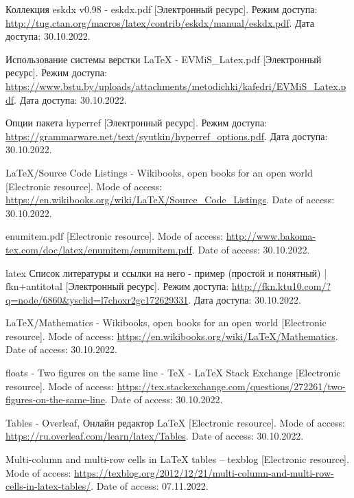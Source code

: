   \begin{thebibliography}{}
    Коллекция eskdx v0.98 - eskdx.pdf
    [Электронный ресурс].
    Режим доступа: \url{http://tug.ctan.org/macros/latex/contrib/eskdx/manual/eskdx.pdf}.
    Дата доступа: 30.10.2022.
  
    Использование системы верстки LaTeX - EVMiS\_Latex.pdf
    [Электронный ресурс].
    Режим доступа: \url{https://www.bstu.by/uploads/attachments/metodichki/kafedri/EVMiS_Latex.pdf}.
    Дата доступа: 30.10.2022.
  
    Опции пакета hyperref
    [Электронный ресурс].
    Режим доступа: \url{https://grammarware.net/text/syutkin/hyperref_options.pdf}.
    Дата доступа: 30.10.2022.
  
    LaTeX/Source Code Listings - Wikibooks, open books for an open world
    [Electronic resource].
    Mode of access: \url{https://en.wikibooks.org/wiki/LaTeX/Source_Code_Listings}.
    Date of access: 30.10.2022.
  
    enumitem.pdf
    [Electronic resource].
    Mode of access: \url{http://www.bakoma-tex.com/doc/latex/enumitem/enumitem.pdf}.
    Date of access: 30.10.2022.
  
    latex Список литературы и ссылки на него - пример (простой и понятный) | fkn+antitotal
    [Электронный ресурс].
    Режим доступа: \url{http://fkn.ktu10.com/?q=node/6860&ysclid=l7choxr2gc172629331}.
    Дата доступа: 30.10.2022.

    LaTeX/Mathematics - Wikibooks, open books for an open world
    [Electronic resource].
    Mode of access: \url{https://en.wikibooks.org/wiki/LaTeX/Mathematics}.
    Date of access: 30.10.2022.

    floats - Two figures on the same line - TeX - LaTeX Stack Exchange
    [Electronic resource].
    Mode of access: \url{https://tex.stackexchange.com/questions/272261/two-figures-on-the-same-line}.
    Date of access: 30.10.2022.

    Tables - Overleaf, Онлайн редактор LaTeX
    [Electronic resource].
    Mode of access: \url{https://ru.overleaf.com/learn/latex/Tables}.
    Date of access: 30.10.2022.

    Multi-column and multi-row cells in LaTeX tables – texblog
    [Electronic resource].
    Mode of access: \url{https://texblog.org/2012/12/21/multi-column-and-multi-row-cells-in-latex-tables/}.
    Date of access: 07.11.2022.   
  \end{thebibliography}
\endgroup

\newpage
